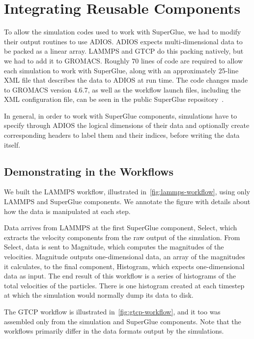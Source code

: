 \section{Integrating Reusable Components}
\label{s:integrating-reusable-components}

To allow the simulation codes used to work
with SuperGlue, we had to modify their output
routines to use ADIOS.
ADIOS expects multi-dimensional data
to be packed as a linear array.
LAMMPS and GTCP do this packing natively,
but we had to add it to GROMACS.
Roughly 70 lines of code are required
to allow each simulation to work with SuperGlue,
along with an approximately 25-line
XML file that describes the data to ADIOS
at run time.
The code changes made to GROMACS version 4.6.7,
as well as the workflow launch files,
including the XML configuration file,
can be seen in the public SuperGlue
repository~\cite{champsaur:superglue-repo}.

In general, in order to work with SuperGlue components, 
simulations have to specify through ADIOS the logical
dimensions of their data and optionally create
corresponding headers to label them and their indices,
before writing the data itself.

\subsection{Demonstrating in the Workflows}

We built the LAMMPS workflow, illustrated
in~\autoref{fig:lammps-workflow},
using only LAMMPS and SuperGlue components.
We annotate the figure with details about how
the data is manipulated at each step.

Data arrives from LAMMPS at the first SuperGlue component, Select, which
extracts the velocity components from the raw output of the simulation. From
Select, data is sent to Magnitude, which computes
the magnitudes of the velocities. Magnitude
outputs one-dimensional data, an array of the magnitudes it calculates, to the
final component, Histogram, which expects one-dimensional data as input. The
end result of this workflow is a series of histograms of the total velocities
of the particles. There is one histogram created at each timestep at which the
simulation would normally dump its data to disk.

The GTCP workflow is illustrated in~\autoref{fig:gtcp-workflow}, and it too was assembled only from the
simulation and SuperGlue components. Note that the workflows primarily differ
in the data formats output by the simulations.

